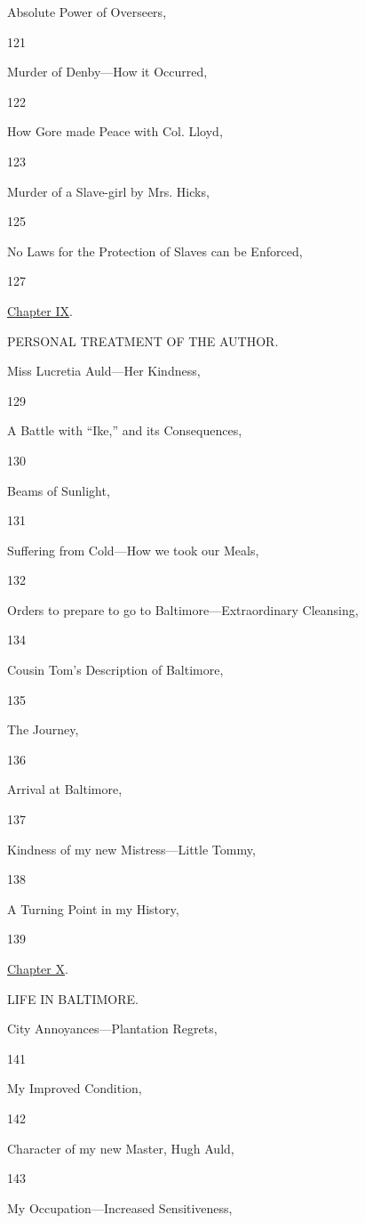Absolute Power of Overseers,

121

Murder of Denby---How it Occurred,

122

How Gore made Peace with Col. Lloyd,

123

Murder of a Slave-girl by Mrs. Hicks,

125

No Laws for the Protection of Slaves can be Enforced,

127

\href{/wiki/My_Bondage_and_My_Freedom_(1855)/Chapter_IX}{Chapter IX}.

PERSONAL TREATMENT OF THE AUTHOR.

Miss Lucretia Auld---Her Kindness,

129

A Battle with ``Ike,'' and its Consequences,

130

Beams of Sunlight,

131

Suffering from Cold---How we took our Meals,

132

Orders to prepare to go to Baltimore---Extraordinary Cleansing,

134

Cousin Tom's Description of Baltimore,

135

The Journey,

136

Arrival at Baltimore,

137

Kindness of my new Mistress---Little Tommy,

138

A Turning Point in my History,

139

\href{/wiki/My_Bondage_and_My_Freedom_(1855)/Chapter_X}{Chapter X}.

LIFE IN BALTIMORE.

City Annoyances---Plantation Regrets,

141

My Improved Condition,

142

Character of my new Master, Hugh Auld,

143

My Occupation---Increased Sensitiveness,

